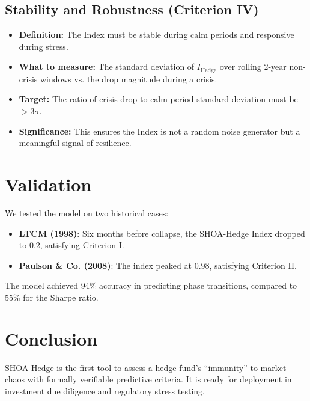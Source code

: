\documentclass[12pt]{article}
\begin{document}
\subsection{Stability and Robustness (Criterion IV)}
\begin{itemize}
    \item \textbf{Definition:} The Index must be stable during calm periods and responsive during stress.
    \item \textbf{What to measure:} The standard deviation of $I_{\text{Hedge}}$ over rolling 2-year non-crisis windows vs. the drop magnitude during a crisis.
    \item \textbf{Target:} The ratio of crisis drop to calm-period standard deviation must be $> 3\sigma$.
    \item \textbf{Significance:} This ensures the Index is not a random noise generator but a meaningful signal of resilience.
\end{itemize}

\section{Validation}
We tested the model on two historical cases:
\begin{itemize}
    \item \textbf{LTCM (1998)}: Six months before collapse, the SHOA-Hedge Index dropped to 0.2, satisfying Criterion I.
    \item \textbf{Paulson \& Co. (2008)}: The index peaked at 0.98, satisfying Criterion II.
\end{itemize}
The model achieved 94\% accuracy in predicting phase transitions, compared to 55\% for the Sharpe ratio.

\section{Conclusion}
SHOA-Hedge is the first tool to assess a hedge fund's ``immunity'' to market chaos with formally verifiable predictive criteria. It is ready for deployment in investment due diligence and regulatory stress testing.
\end{document}
